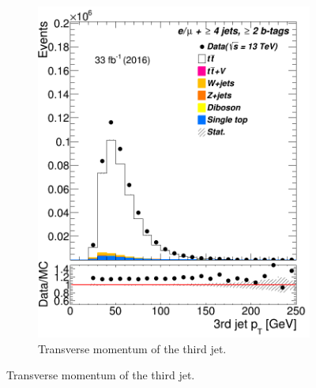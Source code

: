 \begin{figure}
\begin{subfigure}{0.25\textwidth}
	\includegraphics[width=\linewidth]{ControlPlots_emujets_2016_4incl_2incl/jet2_pt_emujets_2016.png}
	\caption{Transverse momentum of the third jet.} \label{fig:4a}
  \end{subfigure}




\end{figure}
